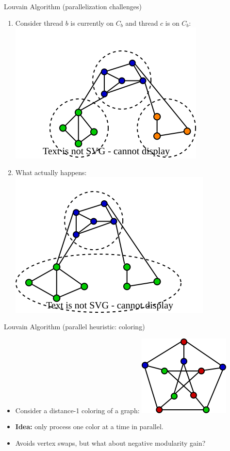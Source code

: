 \begin{frame}[label=louvain-par-challenge]{Louvain Algorithm (parallelization challenges)}
  \begin{enumerate}
  \item<1-> Consider thread $b$ is currently on $C_b$ and thread $c$ is on $C_b$:
  \includegraphics[scale=0.7]{220523_distparallel.drawio.fig1a.svg}

  \item<2-> What actually happens:
  \includegraphics[scale=0.7]{220523_distparallel.drawio.fig1b.svg}
  \end{enumerate}
\end{frame}

\begin{frame}{Louvain Algorithm (parallel heuristic: coloring)}
  \begin{itemize}
    \item<1-> Consider a distance-1 coloring of a graph:
    \includegraphics[scale=1.5]{220523_distparallel.drawio.coloring.svg}
    \item<2-> \textbf{Idea:} only process one color at a time in parallel.
    \item<3-> Avoids vertex swaps, but what about negative modularity gain?
  \end{itemize}
\end{frame}

